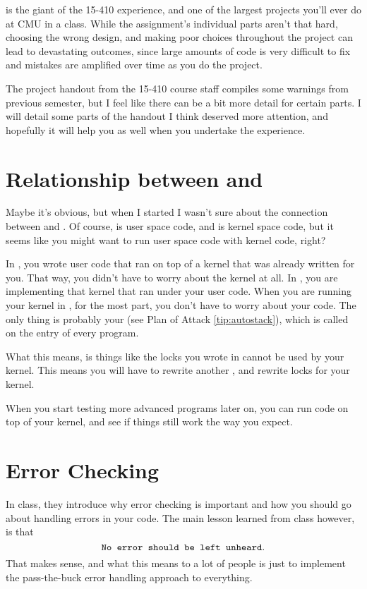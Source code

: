 \documentclass{article}
\begin{document}
\thispagestyle{empty} %
\maketitle
{} is the giant of the 15-410 experience, and one of the largest projects you'll ever do at CMU in a class.
While the assignment's individual parts aren't that hard, choosing the wrong design, and making
poor choices throughout the project can lead to devastating outcomes, since large amounts of code
is very difficult to fix and mistakes are amplified over time as you do the project.

The project handout from the 15-410 course staff compiles some warnings from previous
semester, but I feel like there can be a bit more detail for certain parts. I will 
detail some parts of the handout I think deserved more attention, and hopefully it will
help you as well when you undertake the  experience.

\section{Relationship between  and }
Maybe it's obvious, but when I started  I wasn't sure about the connection
between  and . Of course,  is user space code, and 
is kernel space code, but it seems like you might want to run user space code with kernel code, right?

In , you wrote user code that ran on top of a kernel that was already written for you.
That way, you didn't have to worry about the kernel at all. In , you are implementing
that kernel that ran under your user code. When you are running your kernel in , for the most
part, you don't have to worry about your  code. The only thing is probably your 
 (see Plan of Attack \ref{tip:autostack}), which is called on the entry of every program.

What this means, is things like the locks you wrote in 
cannot be used by your  kernel. This means you will have to rewrite another ,
and rewrite locks for your  kernel.

When you start testing more advanced programs later on, you can run  code
on top of your  kernel, and see if things still work the way you expect.

\section{Error Checking}
\label{sec:error}
In class, they introduce why error checking is important and how you should
go about handling errors in your code. The main lesson learned from class however,
is that 
\begin{equation}
  \texttt{No error should be left unheard}.
\end{equation}
That makes sense, and what this means to a lot of people is just to implement
the pass-the-buck error handling approach to everything.
\end{document}

